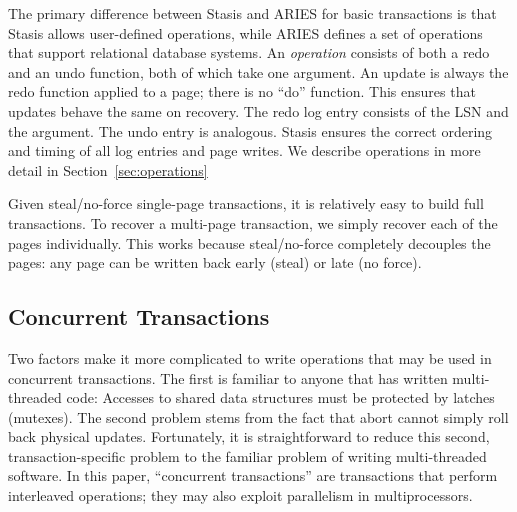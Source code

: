\documentclass[letterpaper,twocolumn,10pt]{article}
\newcommand{\yad}{Stasis\xspace}
\newcommand{\yads}{Stasis'\xspace}
\begin{document}
The primary difference between \yad and ARIES for basic transactions
is that \yad allows user-defined operations, while ARIES defines a set
of operations that support relational database systems.  An {\em
operation} consists of both a redo and an undo function, both of which
take one argument. An update is always the redo function applied to a
page; there is no ``do'' function.  This ensures that updates behave
the same on recovery.  The redo log entry consists of the LSN and the
argument.  The undo entry is analogous.  \yad ensures the correct ordering and timing
of all log entries and page writes.  We describe operations in more
detail in Section~\ref{sec:operations}


Given steal/no-force single-page transactions, it is relatively easy
to build full transactions. 
To recover a multi-page transaction, we simply recover each of
the pages individually.  This works because steal/no-force completely
decouples the pages: any page can be written back early (steal) or
late (no force).  

\subsection{Concurrent Transactions}
\label{sec:nta}

Two factors make it more complicated to write operations that may be
used in concurrent transactions.  The first is familiar to anyone that
has written multi-threaded code: Accesses to shared data structures
must be protected by latches (mutexes).  The second problem stems from
the fact that abort cannot simply roll back physical updates.
Fortunately, it is straightforward to reduce this second,
transaction-specific problem to the familiar problem of writing
multi-threaded software.  In this paper, ``concurrent
transactions'' are transactions that perform interleaved operations; they may also exploit parallelism in multiprocessors.

\end{document}
